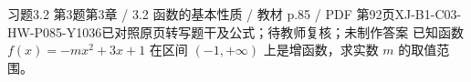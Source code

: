 \par\noindent\begin{minipage}{\linewidth}
\begin{bankitem}{习题3.2 第3题}{第3章 / 3.2 函数的基本性质 / 教材 p.85 / PDF 第92页}{XJ-B1-C03-HW-P085-Y1036}{已对照原页转写题干及公式；待教师复核；未制作答案}
已知函数 $f(x)=-mx^2+3x+1$ 在区间 $(-1,+\infty)$ 上是增函数，求实数 $m$ 的取值范围。
\end{bankitem}
\end{minipage}\par\medskip
